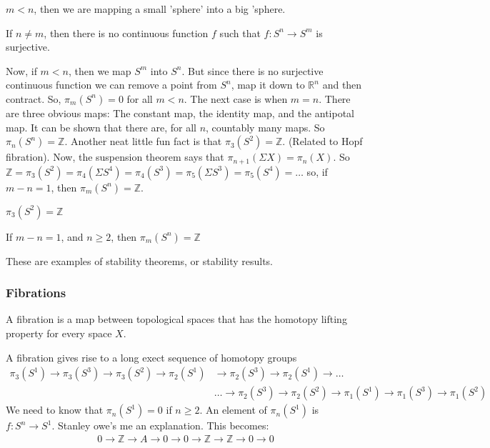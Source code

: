             $m<n$, then we are mapping a small 'sphere' into a big 'sphere.
            \begin{theorem}
                If $n\ne m$, then there is no continuous function $f$ such that
                $f:S^{n}\rightarrow S^{m}$ is surjective.
            \end{theorem}
            Now, if $m<n$, then we map $S^{m}$ into $S^{n}$. But since there is
            no surjective continuous function we can remove a point from
            $S^{n}$, map it down to $\mathbb{R}^{n}$ and then contract. So,
            $\pi_{m}(S^{n})=0$ for all $m<n$. The next case is when $m=n$. There
            are three obvious maps: The constant map, the identity map, and the
            antipotal map. It can be shown that there are, for all $n$,
            countably many maps. So $\pi_{n}(S^{n})=\mathbb{Z}$. Another neat
            little fun fact is that $\pi_{3}(S^{2})=\mathbb{Z}$. (Related to
            Hopf fibration). Now, the suspension theorem says that
            $\pi_{n+1}(\Sigma X)=\pi_{n}(X)$. So
            $\mathbb{Z}=\pi_{3}(S^{2})=\pi_{4}(\Sigma S^4)=\pi_{4}(S^{3})=\pi_{5}(\Sigma S^{3})=\pi_{5}(S^{4})=\hdots$
            so, if $m-n=1$, then $\pi_{m}(S^{n})=\mathbb{Z}$.
            \begin{theorem}
            $\pi_{3}(S^{2})=\mathbb{Z}$
            \end{theorem}
            \begin{theorem}
            If $m-n=1$, and $n\geq 2$, then $\pi_{m}(S^{n})=\mathbb{Z}$
            \end{theorem}
            These are examples of stability theorems, or stability results.
            \subsubsection{Fibrations}
            \begin{definition}
            A fibration is a map between topological spaces that has the homotopy lifting property for every space $X$.
            \end{definition}
            A fibration gives rise to a long exect sequence of homotopy groups
            \begin{align*}
                \pi_{3}(S^{1})\rightarrow\pi_{3}(S^{3})\rightarrow\pi_{3}(S^{2})
                \rightarrow\pi_{2}(S^{1})&\rightarrow\pi_{2}(S^{3})
                \rightarrow\pi_{2}(S^{1})\rightarrow\hdots\\
                &\hdots\rightarrow\pi_{2}(S^{3})\rightarrow\pi_{2}(S^{2})
                \rightarrow\pi_{1}(S^{1})\rightarrow\pi_{1}(S^{3})
                \rightarrow\pi_{1}(S^{2})
            \end{align*}
            We need to know that $\pi_{n}(S^{1})=0$ if $n\geq 2$. An element of $\pi_{n}(S^{1})$ is $f:S^{n}\rightarrow S^{1}$. Stanley owe's me an explanation.
            This becomes:
            \begin{align*}
                0\rightarrow\mathbb{Z}\rightarrow A\rightarrow 0\rightarrow 0\rightarrow\mathbb{Z}\rightarrow\mathbb{Z}\rightarrow 0\rightarrow 0
            \end{align*}
